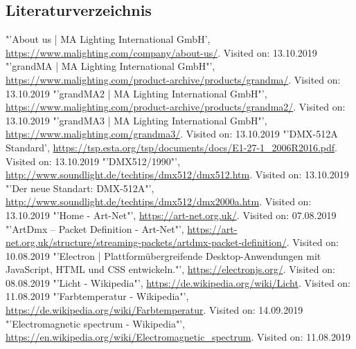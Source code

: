 \documentclass[11pt]{scrartcl}
\begin{document}
\subsection{Literaturverzeichnis}
\begingroup
\renewcommand{\section}[2]{}
\begin{thebibliography}{xxxxxxxxxxxxxxxxxxx}
    "'About us | MA Lighting International GmbH', \url{https://www.malighting.com/company/about-us/}. Visited on: 13.10.2019
    "'grandMA | MA Lighting International GmbH"', \url{https://www.malighting.com/product-archive/products/grandma/}. Visited on: 13.10.2019
    "'grandMA2 | MA Lighting International GmbH"', \url{https://www.malighting.com/product-archive/products/grandma2/}. Visited on: 13.10.2019
    "'grandMA3 | MA Lighting International GmbH"', \url{https://www.malighting.com/grandma3/}. Visited on: 13.10.2019
    "'DMX-512A Standard', \url{https://tsp.esta.org/tsp/documents/docs/E1-27-1_2006R2016.pdf}. Visited on: 13.10.2019
    "'DMX512/1990"', \url{http://www.soundlight.de/techtips/dmx512/dmx512.htm}. Visited on: 13.10.2019
    "'Der neue Standart: DMX-512A"', \url{http://www.soundlight.de/techtips/dmx512/dmx2000a.htm}. Visited on: 13.10.2019
    "'Home - Art-Net"', \url{https://art-net.org.uk/}. Visited on: 07.08.2019
    "'ArtDmx – Packet Definition - Art-Net"', \url{https://art-net.org.uk/structure/streaming-packets/artdmx-packet-definition/}. Visited on: 10.08.2019
    "'Electron | Plattformübergreifende Desktop-Anwendungen mit JavaScript, HTML und CSS entwickeln."', \url{https://electronjs.org/}. Visited on: 08.08.2019
    "'Licht - Wikipedia"', \url{https://de.wikipedia.org/wiki/Licht}. Visited on: 11.08.2019
    "'Farbtemperatur - Wikipedia"', \url{https://de.wikipedia.org/wiki/Farbtemperatur}. Visited on: 14.09.2019
    "'Electromagnetic spectrum - Wikipedia"', \url{https://en.wikipedia.org/wiki/Electromagnetic_spectrum}. Visited on: 11.08.2019

\end{thebibliography}
\end{document}
